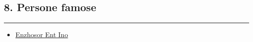 \subsection{8. Persone famose}\label{persone-famose}

\begin{center}\rule{0.5\linewidth}{0.5pt}\end{center}

\begin{itemize}
\tightlist
\item
  \href{Enzhosor\%20Ent\%20Ino\%20d098e258d48c4aaea0dccbf531c4688c.md}{Enzhosor
  Ent Ino}
\end{itemize}
